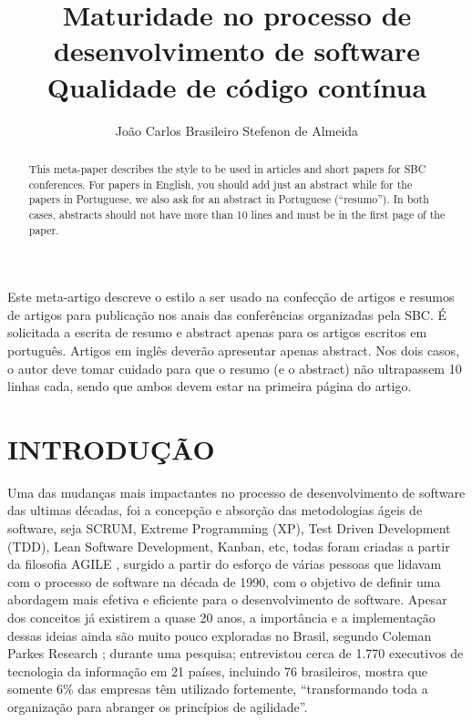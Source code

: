 \documentclass[12pt]{article}
\title{Maturidade no processo de desenvolvimento de software\\ Qualidade de código contínua }
\author{João Carlos  Brasileiro Stefenon de Almeida\inst{1}}
\begin{document}
 

\maketitle

\begin{abstract}
  This meta-paper describes the style to be used in articles and short papers
  for SBC conferences. For papers in English, you should add just an abstract
  while for the papers in Portuguese, we also ask for an abstract in
  Portuguese (``resumo''). In both cases, abstracts should not have more than
  10 lines and must be in the first page of the paper.
\end{abstract}
     
\begin{resumo} 
  Este meta-artigo descreve o estilo a ser usado na confecção de artigos e
  resumos de artigos para publicação nos anais das conferências organizadas
  pela SBC. É solicitada a escrita de resumo e abstract apenas para os artigos
  escritos em português. Artigos em inglês deverão apresentar apenas abstract.
  Nos dois casos, o autor deve tomar cuidado para que o resumo (e o abstract)
  não ultrapassem 10 linhas cada, sendo que ambos devem estar na primeira
  página do artigo.
\end{resumo}



\part{INTRODUÇÃO}

 Uma das mudanças mais impactantes no processo de desenvolvimento de software das ultimas décadas, foi a concepção e absorção das metodologias ágeis de software, seja SCRUM, Extreme Programming (XP), Test Driven Development (TDD), Lean
Software Development, Kanban, etc, todas foram criadas a partir da filosofia AGILE \cite{MANISFESTOAGILE}, surgido a partir do esforço de várias pessoas que lidavam com o processo de software na década de 1990, com o objetivo de definir uma abordagem mais efetiva e eficiente para o desenvolvimento de software. Apesar dos conceitos já existirem a quase 20 anos, a importância e a implementação dessas ideias ainda são muito pouco exploradas no Brasil, segundo Coleman Parkes Research \cite{COLEMANPARKES_AGILE_2017} ; durante uma pesquisa; entrevistou cerca de 1.770 executivos de tecnologia da informação em 21 países, incluindo 76 brasileiros, mostra que somente 6\% das empresas têm utilizado fortemente, “transformando toda a organização para abranger os princípios de agilidade”.
\end{document}
